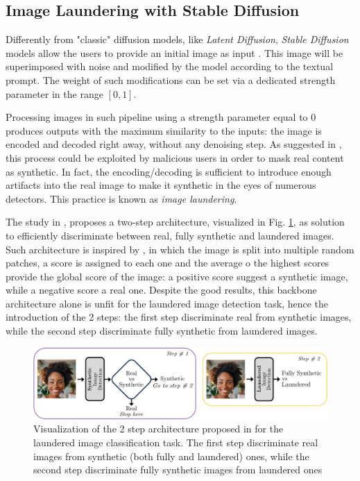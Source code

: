 \documentclass[conference]{IEEEtran} %
\begin{document}
    \subsection{Image Laundering with Stable Diffusion}
        \label{sec:laundering}
        Differently from "classic" diffusion models, like \textit{Latent Diffusion}, \textit{Stable Diffusion} models allow the users to provide an initial image as input \cite{sd1_github} \cite{sd2_github} \cite{podell2023sdxl} \cite{sauer2023adversarial-sdxl-turbo}. This image will be superimposed with noise and modified by the model according to the textual prompt. The weight of such modifications can be set via a dedicated strength parameter in the range $[0, 1]$.

        Processing images in such pipeline using a strength parameter equal to 0 produces outputs with the maximum similarity to the inputs: the image is encoded and decoded right away, without any denoising step. As suggested in \cite{mandelli2024synthetic}, this process could be exploited by malicious users in order to mask real content as synthetic. In fact, the encoding/decoding is sufficient to introduce enough artifacts into the real image to make it synthetic in the eyes of numerous detectors. This practice is known as \textit{image laundering}.

        The study in \cite{mandelli2024synthetic}, proposes a two-step architecture, visualized in Fig. \ref{fig:launder_2_stage}, as solution to efficiently discriminate between real, fully synthetic and laundered images. Such architecture is inspired by \cite{mandelli2022detecting}, in which the image is split into multiple random patches, a score is assigned to each one and the average o the highest scores provide the global score of the image: a positive score suggest a synthetic image, while a negative score a real one. Despite the good results, this backbone architecture alone is unfit for the laundered image detection task, hence the introduction of the 2 steps: the first step discriminate real from synthetic images, while the second step discriminate fully synthetic from laundered images.

        \begin{figure}[h]
            \centering
            \includegraphics[width=0.95\linewidth]{Img/launder_2_stage.png}
            \caption{Visualization of the 2 step architecture proposed in \cite{mandelli2024synthetic} for the laundered image classification task. The first step discriminate real images from synthetic (both fully and laundered) ones, while the second step discriminate fully synthetic images from laundered ones}
            \label{fig:launder_2_stage}
        \end{figure}
\end{document}
